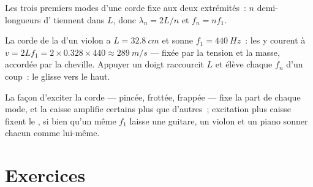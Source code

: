 \begin{omfigure}

{\small Les trois premiers modes d'une corde fixe aux deux extrémités~:
$n$ demi-longueurs d' tiennent dans $L$, donc
$\lambda_n = 2L/n$ et $f_n = nf_1$.}
\end{omfigure}

\begin{example}\label{ex:g12:sound-acoustics:violin}
La corde de la d'un violon a $L = \qty{32.8}{cm}$ et
sonne $f_1 = \qty{440}{Hz}$~: les  y courent à
$v = 2Lf_1 = 2 \times 0.328 \times 440 \approx \qty{289}{m/s}$ ---
fixée par la tension et la masse, accordée par la cheville.
Appuyer un doigt raccourcit $L$ et élève chaque $f_n$ d'un coup~: le
 glisse vers le haut.
\end{example}

\begin{remark}\label{rem:g12:sound-acoustics:instruments}
La façon d'exciter la corde --- pincée, frottée, frappée --- fixe la
part de chaque mode, et la caisse amplifie certains
 plus que d'autres~; excitation plus caisse fixent
le , si bien qu'un même $f_1$ laisse une guitare, un
violon et un piano sonner chacun comme lui-même.
\end{remark}

\section{Exercices}

